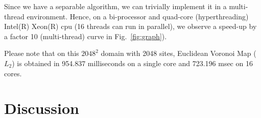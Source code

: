 \documentclass{llncs}
\begin{document}
Since we have a separable algorithm, we can trivially implement it in
a multi-thread environment. Hence, on a bi-processor and quad-core
(hyperthreading) Intel(R) Xeon(R) cpu (16 threads can run in
parallel), we observe a speed-up by a factor 10 (multi-thread) curve
in Fig.~\ref{fig:graph}).

Please note that on this $2048^2$ domain with 2048 sites, Euclidean
Voronoi Map ($L_2$) is obtained in  954.837 milliseconds on a single
core and 723.196 msec on 16 cores.




\section{Discussion}
\label{sec:discussion}



\end{document}
